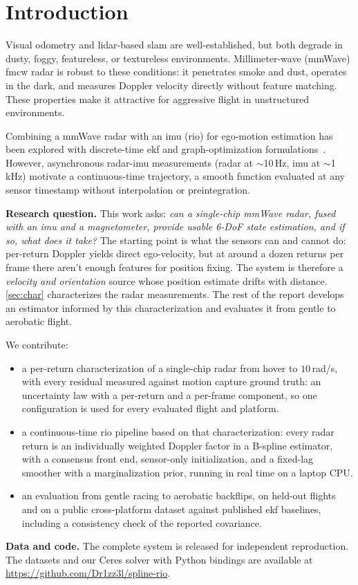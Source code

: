 \section{Introduction}
\label{sec:intro}

Visual odometry and \ac{lidar}-based \ac{slam} are well-established, but both
degrade in dusty, foggy, featureless, or textureless environments.
Millimeter-wave (mmWave) \ac{fmcw} radar is robust to these
conditions: it penetrates smoke and dust, operates in the dark, and
measures Doppler velocity directly without feature matching.  These
properties make it attractive for aggressive flight in unstructured
environments.

Combining a mmWave radar with an \ac{imu} (\ac{rio}) for ego-motion estimation
has been explored with discrete-time \ac{ekf} and graph-optimization
formulations~\cite{doer2020ekf,kramer2020rve}.  However,
asynchronous radar-\ac{imu} measurements (radar at $\sim$10\,Hz, \ac{imu} at
$\sim$1\,kHz) motivate a continuous-time trajectory, a smooth function
evaluated at any sensor timestamp without interpolation or preintegration.

\textbf{Research question.}
This work asks: \emph{can a single-chip mmWave radar,
fused with an \ac{imu} and a magnetometer, provide usable 6-DoF 
state estimation, and if so, what does it take?}  The starting point
is what the sensors can and cannot do: per-return Doppler yields
direct ego-velocity, but at around a dozen returns per frame there
aren't enough features for position fixing.
The system is therefore a \emph{velocity and orientation} source whose
position estimate drifts with distance.
\autoref{sec:char} characterizes the radar measurements.
The rest of the report develops an estimator informed by this
characterization and evaluates it from gentle to aerobatic flight.

We contribute:
\begin{itemize}
  \item a per-return characterization of a single-chip radar from
        hover to $10$\,rad/s, with every residual measured against
        motion capture ground truth: an uncertainty law with a
        per-return and a per-frame component, so one configuration is
        used for every evaluated flight and platform.
  \item a continuous-time \ac{rio} pipeline based on that characterization:
        every radar return is an individually weighted Doppler factor in a B-spline estimator, with a consensus front
        end, sensor-only initialization, and a fixed-lag smoother with
        a marginalization prior, running in real time on a laptop CPU.
  \item an evaluation from gentle racing to aerobatic backflips, on
        held-out flights and on a public cross-platform dataset
        against published \ac{ekf} baselines, including a consistency
        check of the reported covariance.
\end{itemize}

\textbf{Data and code.}
The complete system is released for independent reproduction.  The datasets
and our Ceres solver with Python bindings are available at
\url{https://github.com/Dr1zz3l/spline-rio}.
